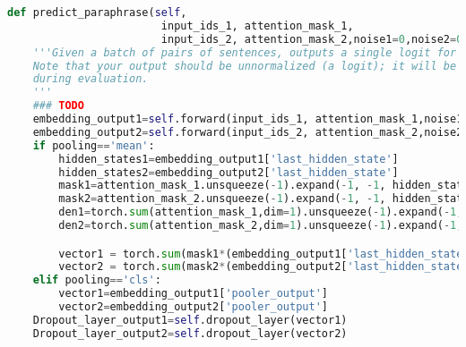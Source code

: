 \begin{lstlisting}[language=Python, caption={predict paraphrase method in Multitask BERT class}, label={lst:predict_paraphrase}, basicstyle=\ttfamily\small, keywordstyle=\color{blue}, commentstyle=\color{green}, stringstyle=\color{red},linewidth=\textwidth]
def predict_paraphrase(self,
                        input_ids_1, attention_mask_1,
                        input_ids_2, attention_mask_2,noise1=0,noise2=0,pooling='mean'):
    '''Given a batch of pairs of sentences, outputs a single logit for predicting whether they are paraphrases.
    Note that your output should be unnormalized (a logit); it will be passed to the sigmoid function
    during evaluation.
    '''
    ### TODO
    embedding_output1=self.forward(input_ids_1, attention_mask_1,noise1)
    embedding_output2=self.forward(input_ids_2, attention_mask_2,noise2)
    if pooling=='mean':
        hidden_states1=embedding_output1['last_hidden_state']
        hidden_states2=embedding_output2['last_hidden_state']
        mask1=attention_mask_1.unsqueeze(-1).expand(-1, -1, hidden_states1.shape[2]).float()
        mask2=attention_mask_2.unsqueeze(-1).expand(-1, -1, hidden_states1.shape[2]).float()
        den1=torch.sum(attention_mask_1,dim=1).unsqueeze(-1).expand(-1, hidden_states1.shape[2])+1e-9
        den2=torch.sum(attention_mask_2,dim=1).unsqueeze(-1).expand(-1, hidden_states1.shape[2])+1e-9

        vector1 = torch.sum(mask1*(embedding_output1['last_hidden_state']), dim=1)/den1
        vector2 = torch.sum(mask2*(embedding_output2['last_hidden_state']), dim=1)/den2
    elif pooling=='cls':
        vector1=embedding_output1['pooler_output']
        vector2=embedding_output2['pooler_output']
    Dropout_layer_output1=self.dropout_layer(vector1)
    Dropout_layer_output2=self.dropout_layer(vector2)


\end{lstlisting}
